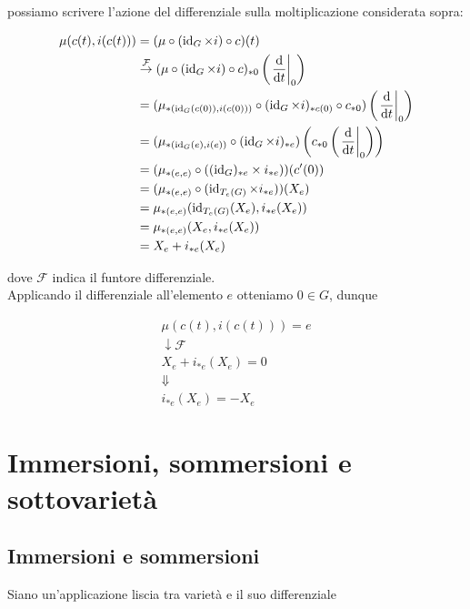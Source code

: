 possiamo scrivere l'azione del differenziale sulla moltiplicazione considerata sopra:

\begin{align}
	\begin{split}
		\mu(c(t),i(c(t))) &= (\mu \circ (\id_{G} \times i) \circ c) (t)\\
		&\stackrel{\mathcal{F}}{\to} ( \mu \circ (\id_{G} \times i) \circ c )_{*0} \left( \eval{ \dv{t} }_{0} \right)\\
		&= ( \mu_{*(\id_{G}(c(0)), i(c(0)))} \circ (\id_{G} \times i)_{*c(0)} \circ c_{*0} ) \left( \eval{ \dv{t} }_{0} \right)\\
		&= ( \mu_{*(\id_{G}(e), i(e))} \circ (\id_{G} \times i)_{*e} ) \left( c_{*0} \left( \eval{ \dv{t} }_{0} \right) \right)\\
		&= ( \mu_{*(e,e)} \circ ((\id_{G})_{*e} \times i_{*e}) ) (c'(0))\\
		&= ( \mu_{*(e,e)} \circ (\id_{T_{e}(G)} \times i_{*e}) ) (X_{e})\\
		&= \mu_{*(e,e)} (\id_{T_{e}(G)} (X_{e}), i_{*e} (X_{e}))\\
		&= \mu_{*(e,e)} (X_{e}, i_{*e} (X_{e}))\\
		&= X_{e} + i_{*e} (X_{e})
	\end{split}
\end{align}

dove $ \mathcal{F} $ indica il funtore differenziale.\\
Applicando il differenziale all'elemento $ e $ otteniamo $ 0 \in G $, dunque

\begin{gather}
		\mu(c(t),i(c(t))) = e\\
		\downarrow \mathcal{F} \nonumber\\
		X_{e} + i_{*e} (X_{e}) = 0\\
		\Downarrow \nonumber\\
		i_{*e}(X_{e}) = - X_{e}
\end{gather}

\section{Immersioni, sommersioni e sottovarietà}

\subsection{Immersioni e sommersioni}

Siano un'applicazione liscia tra varietà e il suo differenziale

